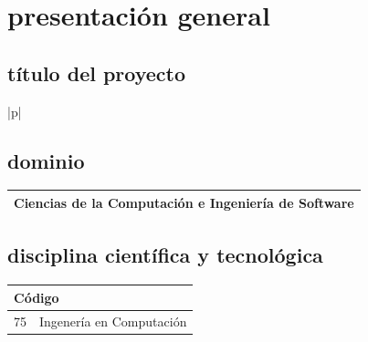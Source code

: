 \documentclass[12pt]{article}
\begin{document}
\renewcommand{\contentsname}{\begin{center}TABLA DE CONTENIDOS\end{center}
\begin{flushleft}{\small Título}\end{flushleft} \vspace{-1cm} \begin{flushright}{\small Página}\end{flushright}}
\renewcommand{\refname}{}


\tableofcontents

\newpage
\section{presentación general}
\subsection{título del proyecto}
\begin{table}[h]
	\centering
	\begin{tabular}{|p{\textwidth}|}
    \hline
    \\
    \hline
	\end{tabular}
\end{table}

\subsection{dominio}
\begin{table}[!h]
	\centering
	\begin{tabular}{|p{\textwidth}|}
    \hline
      Ciencias de la Computación e Ingeniería de Software
      \\
    \hline
	\end{tabular}
\end{table}


\subsection{disciplina científica y tecnológica}
\begin{table}[!h]
	\begin{tabular}{|p{2cm}|p{12.55cm}|}
    \multicolumn{2}{l}{Código} \\
      \hline
      75 & Ingenería en Computación \\ \hline
  \end{tabular}
\end{table}
\end{document}
